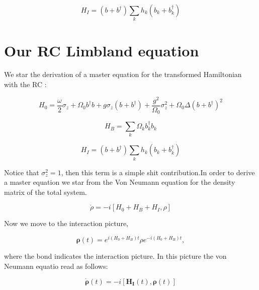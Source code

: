 \documentclass[%
preprint,
onecolumn,
notitlepag,
 amsmath,amssymb,
 aps,
 pra,
]{revtex4-2}
\begin{document}
\begin{equation}
    H_I= \left( b + b ^{\dagger} \right) \sum_k h_k \left( b_k + b_k ^{\dagger} \right)
\end{equation}



\section*{Our RC Limbland equation}


We star the derivation of a master equation for the transformed Hamiltonian with the RC  :

\begin{equation}
    H_0= \frac{\omega}{2} \sigma_z +  \Omega_0 b ^{\dagger} b +g \sigma_z  \left( b + b ^{\dagger} \right) + \frac{g^2}{\Omega_0} \sigma_z^2 + \Omega_0 \Delta \left( b + b ^{\dagger} \right)^2
\end{equation}

\begin{equation}
    H_B= \sum_{k} \Omega_k b_k ^{\dagger} b_k
\end{equation}    

\begin{equation}
    H_I= \left( b + b ^{\dagger} \right) \sum_k h_k \left( b_k + b_k ^{\dagger} \right)
\end{equation}

Notice that $\sigma_z^2= 1$, then this term is a simple shit contribution.In order to derive a master equation we star from the Von Neumann equation for the density matrix of the total system.

\begin{equation}
    \dot{\rho} = -i \left[ H_0 + H_B + H_I , \rho \right]
\end{equation}

Now we move to the interaction picture, 

\begin{equation}
  \boldsymbol{\rho}(t) = e^{i (H_0+H_B) t} \rho e^{-i (H_0+H_B) t},
\end{equation}

where the bond indicates the interaction picture. In this picture the von Neumann equatio read as follows:

\begin{equation}
  \dot{\boldsymbol{\rho}}(t) = -i \left[  \mathbf{H_I}(t) ,  \boldsymbol{\rho}(t)\right]
\end{equation}
\end{document}
